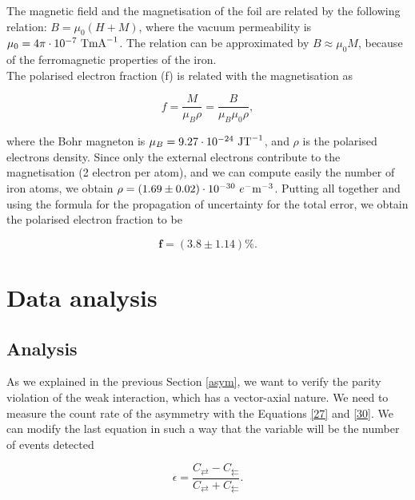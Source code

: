 \documentclass[10pt,swedish, openany]{book}
\begin{document}
The magnetic field and the magnetisation of the foil are related by the following relation: $B = \mu_0 (H+M)$, where the vacuum permeability is $\mu_0 = 4 \pi \cdot 10^{-7}\  {\rm TmA}^{-1}$. The relation can be approximated by $B \approx \mu_0 M$, because of the ferromagnetic properties of the iron.\\

The polarised electron fraction (f) is related with the magnetisation as

\begin{equation}
    f = \frac{M}{\mu_B \rho} = \frac{B}{\mu_B \mu_0 \rho},
\end{equation}

where the Bohr magneton is $\mu_B = 9.27 \cdot 10^{-24} \ {\rm JT}^{-1}$, and $\rho$ is the polarised electrons density. Since only the external electrons contribute to the magnetisation (2 electron per atom), and we can compute easily the number of iron atoms, we obtain $\rho = (1.69 \pm 0.02) \cdot 10^{-30} \ e^-{\rm m}^{-3}$. Putting all together and using the formula for the propagation of uncertainty for the total error, we obtain the polarised electron fraction to be

\begin{equation*}
    \mathbf{f = (3.8 \pm 1.14)\%}.
\end{equation*}

\chapter{Data analysis}
\label{chapter:DataAnalysis}

\section{Analysis}

As we explained in the previous Section \ref{asym}, we want to verify the parity violation of the weak interaction, which has a vector-axial nature. We need to measure the count rate of the asymmetry with the Equations \ref{27} and \ref{30}. We can modify the last equation in such a way that the variable will be the number of events detected

\begin{equation}\label{30}
\epsilon=\frac{C_{\rightleftarrows}-C_{\leftleftarrows}}{C_{\rightleftarrows}+C_{\leftleftarrows}}.
\end{equation}

\end{document}

